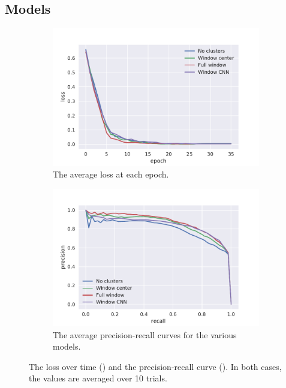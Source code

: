 \FloatBarrier%

\subsection{Models}
\begin{figure}[tb]
  \centering
  \begin{subfigure}[t]{0.49\textwidth}
    \centering
    \includegraphics[width=\textwidth]{./figures/results/models/losses.pdf}
    \caption{The average loss at each epoch.\\}%
    \label{fig:model_loss}
  \end{subfigure}
  \begin{subfigure}[t]{0.49\textwidth}
    \centering
    \includegraphics[width=\textwidth]{./figures/results/models/pr.pdf}
    \caption{The average precision-recall curves for the various models.}%
    \label{fig:model_pr}
  \end{subfigure}
  \caption{The loss over time () and the
    precision-recall curve (). In both cases, the values are
    averaged over 10 trials.}%
    \label{fig:model_plots}
\end{figure}

